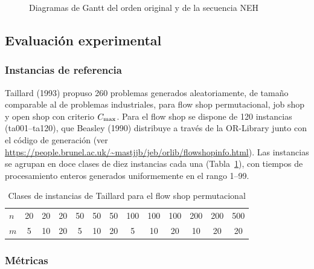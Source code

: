 \begin{figure}[htbp]
\caption{Diagramas de Gantt del orden original y de la secuencia NEH}\label{fig:gantt}
\centering
{}
\end{figure}

\subsection{Evaluación experimental}

\subsubsection{Instancias de referencia}

Taillard (1993) propuso 260 problemas generados aleatoriamente, de tamaño comparable al de
problemas industriales, para flow shop permutacional, job shop y open shop con criterio
$C_{\max}$. Para el flow shop se dispone de 120 instancias (ta001--ta120), que Beasley (1990)
distribuye a través de la OR-Library junto con el código de generación (ver
\url{https://people.brunel.ac.uk/~mastjjb/jeb/orlib/flowshopinfo.html}). Las instancias se
agrupan en doce clases de diez instancias cada una (Tabla~\ref{tab:taillard}), con tiempos
de procesamiento enteros generados uniformemente en el rango 1--99.

\begin{table}[htbp]
\caption{Clases de instancias de Taillard para el flow shop permutacional}\label{tab:taillard}
\centering
\begin{tabular}{@{}lcccccccccccc@{}}
\toprule
$n$ & 20 & 20 & 20 & 50 & 50 & 50 & 100 & 100 & 100 & 200 & 200 & 500 \\
$m$ & 5 & 10 & 20 & 5 & 10 & 20 & 5 & 10 & 20 & 10 & 20 & 20 \\
\bottomrule
\end{tabular}
\end{table}

\subsubsection{Métricas}

